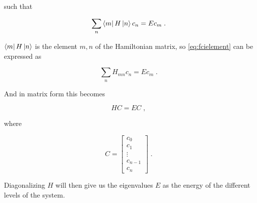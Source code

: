 such that

\begin{equation} \label{eq:fcielement}
   \sum_n \bra{m} H \ket{n} c_n  =  E c_m \; . 
\end{equation}

$\bra{m} H \ket{n}$ is the element $m, n$ of the Hamiltonian matrix, so \ref{eq:fcielement} can be expressed as

\begin{equation}
   \sum_n H_{mn} c_n  =  E c_m \; . 
\end{equation}

And in matrix form this becomes

\begin{equation}
    HC = EC \; ,
\end{equation}

where

$$C = \begin{bmatrix}
    c_0 \\
    c_1 \\
    \vdots \\
    c_{n-1} \\
    c_n
\end{bmatrix} \; .$$

Diagonalizing $H$ will then give us the eigenvalues $E$ as the energy of the different levels of the system.
